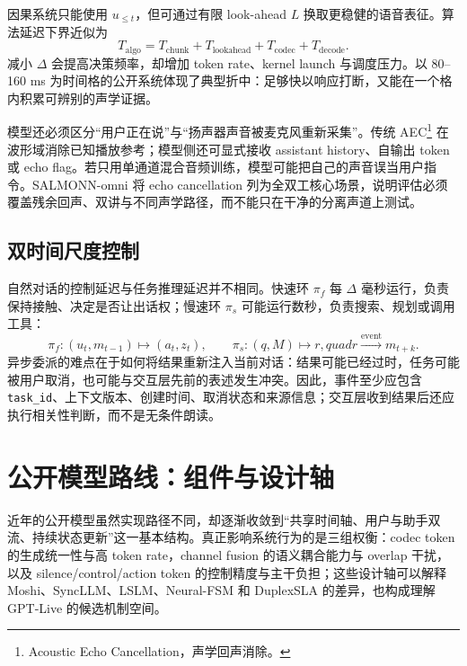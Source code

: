 \documentclass[UTF8,fontset=none,a4paper,10pt]{ctexart}
\begin{document}
因果系统只能使用 $u_{\le t}$，但可通过有限 look-ahead $L$ 换取更稳健的语音表征。算法延迟下界近似为
\begin{equation}
T_{\mathrm{algo}}=T_{\mathrm{chunk}}+T_{\mathrm{lookahead}}+T_{\mathrm{codec}}+T_{\mathrm{decode}}.
\end{equation}
减小 $\Delta$ 会提高决策频率，却增加 token rate、kernel launch 与调度压力。以 80--160 ms 为时间格的公开系统体现了典型折中：足够快以响应打断，又能在一个格内积累可辨别的声学证据\cite{zh:defossez2024moshi,zh:zhang2026duplexsla}。

模型还必须区分“用户正在说”与“扬声器声音被麦克风重新采集”。传统 AEC\footnote{Acoustic Echo Cancellation，声学回声消除。} 在波形域消除已知播放参考；模型侧还可显式接收 assistant history、自输出 token 或 echo flag。若只用单通道混合音频训练，模型可能把自己的声音误当用户指令。SALMONN-omni 将 echo cancellation 列为全双工核心场景\cite{zh:yu2025salmonnomni}，说明评估必须覆盖残余回声、双讲与不同声学路径，而不能只在干净的分离声道上测试。

\subsection{双时间尺度控制}

自然对话的控制延迟与任务推理延迟并不相同。快速环 $\pi_f$ 每 $\Delta$ 毫秒运行，负责保持接触、决定是否让出话权；慢速环 $\pi_s$ 可能运行数秒，负责搜索、规划或调用工具：
\begin{equation}
\pi_f:(u_t,m_{t-1})\mapsto(a_t,z_t),\qquad
\pi_s:(q,M)\mapsto r,quad r\xrightarrow{\mathrm{event}}m_{t+k}.
\end{equation}
异步委派的难点在于如何将结果重新注入当前对话：结果可能已经过时，任务可能被用户取消，也可能与交互层先前的表述发生冲突。因此，事件至少应包含 \texttt{task\_id}、上下文版本、创建时间、取消状态和来源信息；交互层收到结果后还应执行相关性判断，而不是无条件朗读。

\section{公开模型路线：组件与设计轴}

近年的公开模型虽然实现路径不同，却逐渐收敛到“共享时间轴、用户与助手双流、持续状态更新”这一基本结构。真正影响系统行为的是三组权衡：codec token 的生成统一性与高 token rate，channel fusion 的语义耦合能力与 overlap 干扰，以及 silence/control/action token 的控制精度与主干负担；这些设计轴可以解释 Moshi、SyncLLM、LSLM、Neural-FSM 和 DuplexSLA 的差异，也构成理解 GPT-Live 的候选机制空间。
\end{document}
